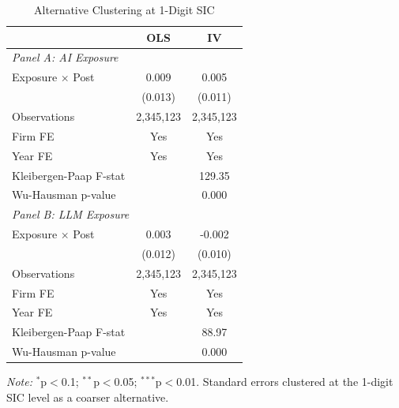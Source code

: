 \begin{table}[!h]
\centering
\caption{Alternative Clustering at 1-Digit SIC}
\centering
\begin{threeparttable}
\begin{tabular*}{\textwidth}{@{\extracolsep{\fill}}lcc}
\toprule
 & OLS & IV\\
\midrule
\multicolumn{3}{l}{\textit{Panel A: AI Exposure}}\\
\hline
\hspace{1em}Exposure $\times$ Post & 0.009 & 0.005\\
\hspace{1em} & (0.013) & (0.011)\\
\hspace{1em}Observations & 2,345,123 & \vphantom{1} 2,345,123\\
\hspace{1em}Firm FE & Yes & \vphantom{1} Yes\\
\hspace{1em}Year FE & Yes & \vphantom{1} Yes\\
\hspace{1em}Kleibergen-Paap F-stat &  & 129.35\\
\hspace{1em}Wu-Hausman p-value &  & \vphantom{1} 0.000\\
\multicolumn{3}{l}{\textit{Panel B: LLM Exposure}}\\
\hline
\hspace{1em}Exposure $\times$ Post & 0.003 & -0.002\\
\hspace{1em} & (0.012) & (0.010)\\
\hspace{1em}Observations & 2,345,123 & 2,345,123\\
\hspace{1em}Firm FE & Yes & Yes\\
\hspace{1em}Year FE & Yes & Yes\\
\hspace{1em}Kleibergen-Paap F-stat &  & 88.97\\
\hspace{1em}Wu-Hausman p-value &  & 0.000\\
\midrule
\midrule
\bottomrule
\end{tabular*}

\begin{tablenotes}
\item \textit{Note:} $^{*}$p$<$0.1; $^{**}$p$<$0.05; $^{***}$p$<$0.01. Standard errors clustered at the 1-digit SIC level as a coarser alternative.
\end{tablenotes}
\end{threeparttable}
\end{table}
